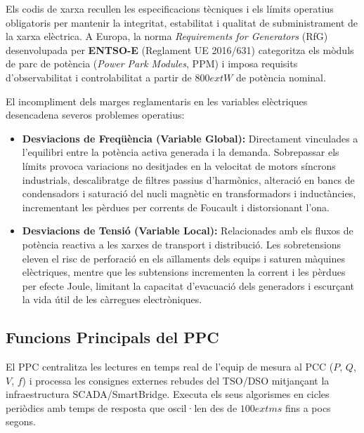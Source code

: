 \documentclass[
  catalan,
  letterpaper,
  DIV=11,
  numbers=noendperiod]{scrartcl}
\providecommand{\tightlist}{%
  \setlength{\itemsep}{0pt}\setlength{\parskip}{0pt}}
\begin{document}
Els codis de xarxa recullen les especificacions tècniques i els límits
operatius obligatoris per mantenir la integritat, estabilitat i qualitat
de subministrament de la xarxa elèctrica. A Europa, la norma
\emph{Requirements for Generators} (RfG) desenvolupada per
\textbf{ENTSO-E} (Reglament UE 2016/631) categoritza els mòduls de parc
de potència (\emph{Power Park Modules}, PPM) i imposa requisits
d'observabilitat i controlabilitat a partir de \(800    ext{ W}\) de
potència nominal.

El incompliment dels marges reglamentaris en les variables elèctriques
desencadena severos problemes operatius:

\begin{itemize}
\tightlist
\item
  \textbf{Desviacions de Freqüència (Variable Global):} Directament
  vinculades a l'equilibri entre la potència activa generada i la
  demanda. Sobrepassar els límits provoca variacions no desitjades en la
  velocitat de motors síncrons industrials, descalibratge de filtres
  passius d'harmònics, alteració en bancs de condensadors i saturació
  del nucli magnètic en transformadors i inductàncies, incrementant les
  pèrdues per corrents de Foucault i distorsionant l'ona.
\item
  \textbf{Desviacions de Tensió (Variable Local):} Relacionades amb els
  fluxos de potència reactiva a les xarxes de transport i distribució.
  Les sobretensions eleven el risc de perforació en els aïllaments dels
  equips i saturen màquines elèctriques, mentre que les subtensions
  incrementen la corrent i les pèrdues per efecte Joule, limitant la
  capacitat d'evacuació dels generadors i escurçant la vida útil de les
  càrregues electròniques.
\end{itemize}

\subsection{Funcions Principals del
PPC}\label{funcions-principals-del-ppc}

El PPC centralitza les lectures en temps real de l'equip de mesura al
PCC (\(P\), \(Q\), \(V\), \(f\)) i processa les consignes externes
rebudes del TSO/DSO mitjançant la infraestructura SCADA/SmartBridge.
Executa els seus algorismes en cicles periòdics amb temps de resposta
que oscil·len des de \(100   ext{ ms}\) fins a pocs segons.
\end{document}
